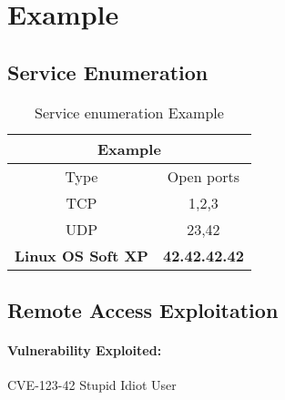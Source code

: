 \renewcommand{\hostname}{Example}
\renewcommand{\os}{Linux OS Soft XP}
\renewcommand{\ip}{42.42.42.42}
\renewcommand{\tcpports}{1,2,3}
\renewcommand{\udpports}{23,42}
\renewcommand{\vuln}{CVE-123-42 \glqq Stupid Idiot User\grqq}
\renewcommand{\vulnx}{CVE-123-43 \glqq Very Stupid Idiot User Again\grqq} 
\def\root{}   %



\section{\hostname}
\subsection{Service Enumeration}

\begin{table}[h]
	\begin{tabular}{|c|c|}
		\hline
		\multicolumn{2}{|c|}{\textbf{\hostname}}\\\hline\hline
		Type         & Open ports   \\\hline
		TCP          & \tcpports{}  \\\hline
		UDP          & \udpports{}  \\\hline\hline
		\textbf{\os} & \textbf{\ip} \\\hline
	\end{tabular}
	\caption{Service enumeration \hostname}
\end{table}

\subsection{Remote Access Exploitation}

\paragraph{Vulnerability Exploited:}
\vuln

